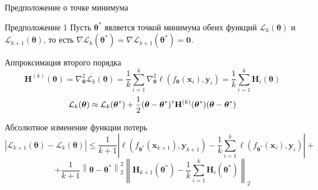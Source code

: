 \documentclass[aspectratio=169]{beamer}
\begin{document}
\begin{frame}{Предположение о точке минимума}
    \begin{block}{Предположение 1}
        \vspace{-0.5em}
        Пусть $\boldsymbol{\theta}^*$ является точкой минимума обеих функций $\mathcal{L}_{k}(\boldsymbol{\theta})$ и $\mathcal{L}_{k+1}(\boldsymbol{\theta})$, то есть $\nabla \mathcal{L}_{k}(\boldsymbol{\theta}^*) = \nabla \mathcal{L}_{k+1}(\boldsymbol{\theta}^*) = \mathbf{0}$.
    \end{block}
    \vspace{-0.5em}
    \begin{block}{Аппроксимация второго порядка}
        \vspace{-1em}
        \[ \mathbf{H}^{(k)}(\boldsymbol{\theta}) = \nabla^2_{\boldsymbol{\theta}} \mathcal{L}_{k}(\boldsymbol{\theta}) = \dfrac{1}{k} \sum\limits_{i=1}^{k} \nabla^2_{\boldsymbol{\theta}} \ell(f_{\boldsymbol{\theta}}(\mathbf{x}_{i}), \mathbf{y}_{i}) = \dfrac{1}{k} \sum\limits_{i=1}^{k} \mathbf{H}_{i}(\boldsymbol{\theta}) \]
        \vspace{-0.5em}
        \begin{equation*}
            \mathcal{L}_{k}(\boldsymbol{\theta}) \approx \mathcal{L}_{k}(\boldsymbol{\theta}^*) + \dfrac{1}{2} (\boldsymbol{\theta} - \boldsymbol{\theta}^*)^{\text{\tiny\sffamily\upshape\mdseries T}} \mathbf{H}^{(k)}(\boldsymbol{\theta}^*) (\boldsymbol{\theta} - \boldsymbol{\theta}^*)
        \end{equation*}
    \end{block}
    \vspace{-1em}
    \begin{block}{Абсолютное изменение функции потерь}
        \vspace{-0.7em}
        \[ \left| \mathcal{L}_{k+1}(\boldsymbol{\theta}) - \mathcal{L}_k(\boldsymbol{\theta}) \right| \leqslant \dfrac{1}{k+1} \left| \ell(f_{\boldsymbol{\theta}^*}(\mathbf{x}_{k+1}), \mathbf{y}_{k+1}) - \dfrac{1}{k} \sum\limits_{i=1}^{k} \ell(f_{\boldsymbol{\theta}^*}(\mathbf{x}_{i}), \mathbf{y}_{i}) \right| + \]
        \vspace{-0.5em}
        \[ + \dfrac{1}{k+1} \left\|\boldsymbol{\theta} - \boldsymbol{\theta}^*\right\|_2^2 \left\| \mathbf{H}_{k+1}(\boldsymbol{\theta}^*) - \dfrac{1}{k} \sum\limits_{i=1}^{k} \mathbf{H}_{i}(\boldsymbol{\theta}^*) \right\|_2 \]
    \end{block}
\end{frame}
\end{document}
